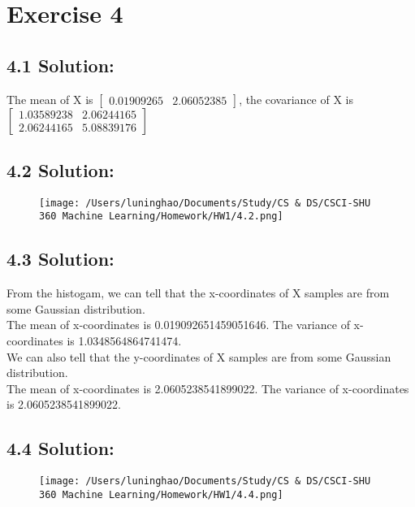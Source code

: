 \documentclass{article}
\begin{document}
\section*{Exercise 4}
\subsection*{4.1 Solution:}
The mean of X is $\begin{bmatrix}0.01909265 & 2.06052385\end{bmatrix}$, the covariance of X is $\begin{bmatrix}1.03589238 & 2.06244165 \\ 2.06244165 & 5.08839176\end{bmatrix}$

\subsection*{4.2 Solution:}
\begin{figure}[h]
    \centering
    \texttt{[image: /Users/luninghao/Documents/Study/CS \& DS/CSCI-SHU 360 Machine Learning/Homework/HW1/4.2.png]}
\end{figure}

\subsection*{4.3 Solution:}
From the histogam, we can tell that the x-coordinates of X samples are from some Gaussian distribution.\\
The mean of x-coordinates is 0.019092651459051646. The variance of x-coordinates is 1.0348564864741474. \\
We can also tell that the y-coordinates of X samples are from some Gaussian distribution.\\
The mean of x-coordinates is 2.0605238541899022. The variance of x-coordinates is 2.0605238541899022.

\newpage
\subsection*{4.4 Solution:}
\begin{figure}[h]
    \centering
    \texttt{[image: /Users/luninghao/Documents/Study/CS \& DS/CSCI-SHU 360 Machine Learning/Homework/HW1/4.4.png]}
\end{figure}
\end{document}
